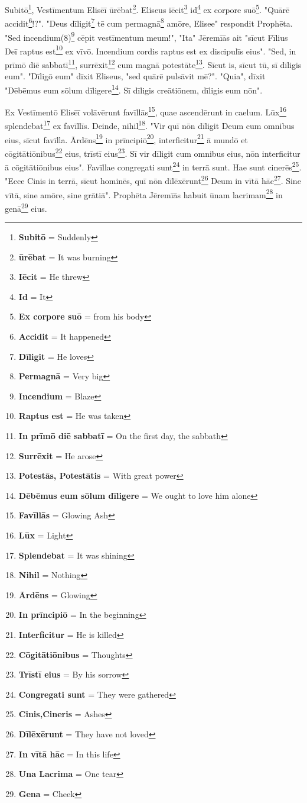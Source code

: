 Subitō\footnote{\textbf{Subitō} = Suddenly}, Vestīmentum Elisēī ūrēbat\footnote{\textbf{ūrēbat} = It was burning}. Eliseus iēcit\footnote{\textbf{Iēcit} = He threw} id\footnote{\textbf{Id} = It} ex corpore suō\footnote{\textbf{Ex corpore suō} = from his body}. "Quārē accidit\footnote{\textbf{Accidit} = It happened}!?". "Deus dīligit\footnote{\textbf{Dīligit} = He loves} tē cum permagnā\footnote{\textbf{Permagnā} = Very big} amōre, Elisee" respondit Prophēta. "Sed incendium(8)\footnote{\textbf{Incendium} = Blaze} cēpit vestīmentum meum!", "Ita" Jēremīās ait "sīcut Fīlius Deī raptus est\footnote{\textbf{Raptus est} = He was taken} ex vīvō. Incendium cordis raptus est ex discipulīs eius". "Sed, in prīmō diē sabbatī\footnote{\textbf{In prīmō diē sabbatī} = On the first day, the sabbath}, surrēxit\footnote{\textbf{Surrēxit} = He arose} cum magnā potestāte\footnote{\textbf{Potestās, Potestātis} = With great power}. Sīcut is, sīcut tū, sī dīligis eum". "Dīligō eum" dīxit Eliseus, "sed quārē pulsāvit mē?". "Quia", dīxit "Dēbēmus eum sōlum dīligere\footnote{\textbf{Dēbēmus eum sōlum dīligere} = We ought to love him alone}. Sī dīligis creātiōnem, dīligis eum nōn". \par 
Ex Vestīmentō Elisēī volāvērunt favīllās\footnote{\textbf{Favīllās} = Glowing Ash}, quae ascendērunt in caelum. Lūx\footnote{\textbf{Lūx} = Light} splendebat\footnote{\textbf{Splendebat} = It was shining} ex favīllīs. Deinde, nihil\footnote{\textbf{Nihil} = Nothing}. "Vir quī nōn dīligit Deum cum omnibus eius, sīcut favīlla. Ārdēns\footnote{\textbf{Ārdēns} = Glowing} in prīncipiō\footnote{\textbf{In prīncipiō} = In the beginning}, interficitur\footnote{\textbf{Interficitur} = He is killed} ā mundō et cōgitātiōnibus\footnote{\textbf{Cōgitātiōnibus} = Thoughts} eius, trīstī eius\footnote{\textbf{Trīstī eius} = By his sorrow}. Sī vir dīligit cum omnibus eius, nōn interficitur ā cōgitātiōnibus eius". Favīllae congregati sunt\footnote{\textbf{Congregati sunt} = They were gathered} in terrā sunt. Hae sunt cinerēs\footnote{\textbf{Cinis,Cineris} = Ashes}. "Ecce Cinis in terrā, sīcut hominēs, quī nōn dīlēxērunt\footnote{\textbf{Dīlēxērunt} = They have not loved} Deum in vītā hāc\footnote{\textbf{In vītā hāc} = In this life}. Sine vītā, sine amōre, sine grātiā". Prophēta Jēremīās habuit ūnam lacrimam\footnote{\textbf{Una Lacrima} = One tear} in genā\footnote{\textbf{Gena} = Cheek} eius. \par 
